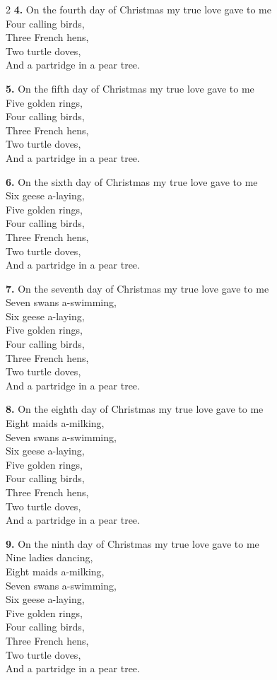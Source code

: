 \documentclass[a5paper,12pt]{article}
\begin{document}
\begin{multicols}{2}
\small
\textbf{4.} On the fourth day of Christmas my true love gave to me\\
Four calling birds,\\
Three French hens,\\
Two turtle doves,\\
And a partridge in a pear tree.

\textbf{5.} On the fifth day of Christmas my true love gave to me\\
Five golden rings,\\
Four calling birds,\\
Three French hens,\\
Two turtle doves,\\
And a partridge in a pear tree.

\textbf{6.} On the sixth day of Christmas my true love gave to me\\
Six geese a-laying,\\
Five golden rings,\\
Four calling birds,\\
Three French hens,\\
Two turtle doves,\\
And a partridge in a pear tree.

\textbf{7.} On the seventh day of Christmas my true love gave to me\\
Seven swans a-swimming,\\
Six geese a-laying,\\
Five golden rings,\\
Four calling birds,\\
Three French hens,\\
Two turtle doves,\\
And a partridge in a pear tree.

\textbf{8.} On the eighth day of Christmas my true love gave to me\\
Eight maids a-milking,\\
Seven swans a-swimming,\\
Six geese a-laying,\\
Five golden rings,\\
Four calling birds,\\
Three French hens,\\
Two turtle doves,\\
And a partridge in a pear tree.

\textbf{9.} On the ninth day of Christmas my true love gave to me\\
Nine ladies dancing,\\
Eight maids a-milking,\\
Seven swans a-swimming,\\
Six geese a-laying,\\
Five golden rings,\\
Four calling birds,\\
Three French hens,\\
Two turtle doves,\\
And a partridge in a pear tree.


\end{multicols}
\end{document}

